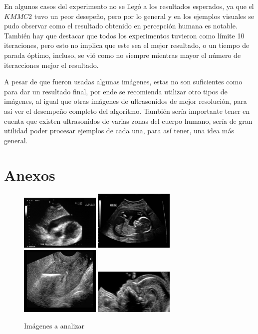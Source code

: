 \documentclass[a4paper,10pt,twocolumn]{article}
\begin{document}
En algunos casos del experimento no se lleg\'o a los resultados esperados, ya que el $KMMC2$ tuvo un peor desepe\~no, pero por lo general y en los ejemplos visuales se pudo observar como el resultado obtenido en percepci\'on humana es notable. Tambi\'en hay que destacar que todos los experimentos tuvieron como l\'imite 10 iteraciones, pero esto no implica que este sea el mejor resultado, o un tiempo de parada \'optimo, incluso, se vi\'o como no siempre mientras mayor el n\'umero de iteracciones mejor el resultado.

A pesar de que fueron usadas algunas im\'agenes, estas no son suficientes como para dar un resultado final, por ende se recomienda utilizar otro tipos de im\'agenes, al igual que otras im\'agenes de ultrasonidos de mejor resoluci\'on, para as\'i ver el desempe\~no completo del algoritmo. Tambi\'en ser\'ia importante tener en cuenta que existen ultrasonidos de varias zonas del cuerpo humano, ser\'ia de gran utilidad poder procesar ejemplos de cada una, para as\'i tener, una idea m\'as general.

\section{Anexos}\label{sec:anexos}

\begin{figure}[!htb]
	\centering
	\includegraphics[width=3.8cm]{image/im1/im_1}
	\includegraphics[width=3.8cm]{image/im3/im_3}
	\includegraphics[width=3.8cm]{image/im5/im_5}
	\includegraphics[width=3.8cm]{image/im7/im_7}
	\caption{Im\'agenes a analizar \label{fig:imagenes_analizar}}
\end{figure}
\end{document}
